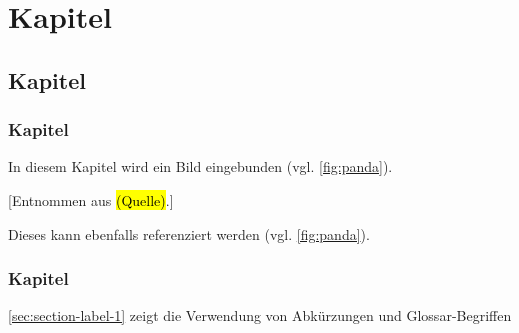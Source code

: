 \chapter{Kapitel}

\section{Kapitel}

\subsection{Kapitel}\label{sec:section-label}

In diesem Kapitel wird ein Bild eingebunden (vgl. \autoref{fig:panda}).

[Entnommen aus \hl{(Quelle)}.]

Dieses kann ebenfalls referenziert werden (vgl. \autoref{fig:panda}).

\subsection{Kapitel}

\autoref{sec:section-label-1} zeigt die Verwendung von Abkürzungen und Glossar-Begriffen
